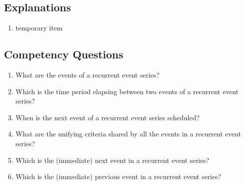 \subsection{Explanations}
\label{exp:recurrent-event}
\begin{enumerate}
\item temporary item
\end{enumerate}

\subsection{Competency Questions}
\label{cqs:recurrent-event}
\begin{enumerate}[CQ1.]
    \item What are the events of a recurrent event series?
    \item Which is the time period elapsing between two events of a recurrent event series?
    \item When is the next event of a recurrent event series scheduled?
    \item What are the unifying criteria shared by all the events in a recurrent event series?
    \item Which is the (immediate) next event in a recurrent event series?
    \item Which is the (immediate) previous event in a recurrent event series?
\end{enumerate}

\newpage
